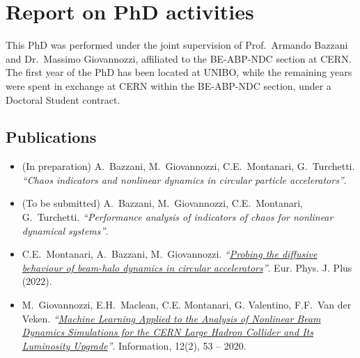 \chapter*{Report on PhD activities}
\sectionmark{}

This PhD was performed under the joint supervision of Prof.~Armando Bazzani and Dr.~Massimo Giovannozzi, affiliated to the BE-ABP-NDC section at CERN. The first year of the PhD has been located at UNIBO, while the remaining years were spent in exchange at CERN within the BE-ABP-NDC section, under a Doctoral Student contract.

\section*{Publications}

\begin{itemize}
    \item (In preparation) A.\ Bazzani, M.\ Giovannozzi, C.E.\ Montanari, G.\ Tur\-chet\-ti. \textit{``Chaos indicators and nonlinear dynamics in circular particle accelerators''}.
    
    \item (To be submitted) A.\ Bazzani, M.\ Giovannozzi, C.E.\ Montanari, G.\ Turchetti. \textit{``Performance analysis of indicators of chaos for nonlinear dynamical systems''}.

    \item  C.E.\ Montanari, A.\ Bazzani, M.\ Giovannozzi. \textit{``\href{https://doi.org/10.1140/epjp/s13360-022-03478-w}{Probing the diffusive behaviour of beam-halo dynamics in circular accelerators}''}. Eur. Phys. J. Plus (2022).

    \item M.\ Giovannozzi, E.H.\ Maclean, C.E. Montanari, G. Valentino, F.F.\ Van der Veken. \textit{``\href{https://doi.org/10.3390/info12020053}{Machine Learning Applied to the Analysis of Nonlinear Beam Dynamics Simulations for the CERN Large Hadron Collider and Its Luminosity Upgrade}''}. Information, 12(2), 53 -- 2020.

\end{itemize}

